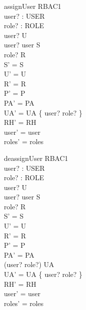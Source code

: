 \begin{zedgroup}
  \begin{schema}{assignUser}
    \Delta RBAC1\\
    user? : USER\\
    role? : ROLE\\
    \where
    user? \in U\\
    user? \notin user \limg S \rimg\\
    role? \in R\\
    S' = S\\
    U' = U\\
    R' = R\\
    P' = P\\
    PA' = PA\\
    UA' = UA \oplus \{ user? \mapsto role? \}\\
    RH' = RH\\
    user' = user\\
    roles' = roles\\
  \end{schema}
  \begin{schema}{deassignUser}
    \Delta RBAC1\\
    user? : USER\\
    role? : ROLE\\
    \where
    user? \in U\\
    user? \notin user \limg S \rimg\\
    role? \in R\\
    S' = S\\
    U' = U\\
    R' = R\\
    P' = P\\
    PA' = PA\\
    (user? \mapsto role?) \in UA\\
    UA' = UA \setminus \{ user? \mapsto role? \}\\
    RH' = RH\\
    user' = user\\
    roles' = roles\\
  \end{schema}
\end{zedgroup}

